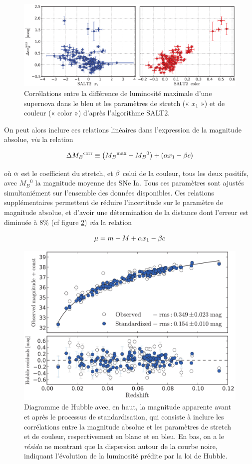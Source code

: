 \documentclass[a4paper, 12pt, svgnames]{article}
\begin{document}
\begin{figure}[htbp!]
    \centering
    \includegraphics[width=.7\linewidth]{Rapport_figures/disp_x1_c.PNG}
    \captionsetup{justification=centering}
    \caption{Corrélations entre la différence de luminosité maximale d'une
    supernova dans le bleu et les paramètres de stretch (« $x_1$ ») et de
couleur (« color ») d'après l'algorithme SALT2.}
    \label{brighter_slower_bluer}
\end{figure}

On peut alors inclure ces relations linéaires dans l'expression de la magnitude
absolue, \textit{via} la relation

\begin{equation}
    \Delta M_B{}^{\text{corr}} \equiv \left(M_B{}^{\text{max}} - M_B{}^0\right) + \left(\alpha x_1
    - \beta c\right)
\end{equation}

où $\alpha$ est le coefficient du stretch, et $\beta$ celui de la couleur, tous les
deux positifs, avec $M_B{}^0$ la magnitude moyenne des SNe Ia. Tous ces
paramètres sont ajustés simultaniément sur l'ensemble des données disponibles.
Ces relations supplémentaires permettent de réduire l'incertitude sur le
paramètre de magnitude absolue, et d'avoir une détermination de la distance dont
l'erreur est diminuée à 8\% (cf figure \ref{disp_20}) \textit{via} la relation

\begin{equation}
    \mu = m - M +\alpha x_1 - \beta c
\end{equation}

\begin{figure}[htbp!]
    \centering
    \includegraphics[width=.5\linewidth]{Rapport_figures/disp_beau.png}
    \captionsetup{justification=centering}
    \caption{Diagramme de Hubble avec, en haut, la magnitude apparente avant et
        après le processus de standardisation, qui consiste à inclure les
        corrélations entre la magnitude absolue et les paramètres de stretch et
        de couleur, respectivement en blanc et en bleu. En bas, on a le
        \textit{résidu} ne montrant que la dispersion autour de la courbe noire,
        indiquant l'évolution de la luminosité prédite par la loi de Hubble.}
    \label{disp_20}
\end{figure}
\end{document}
